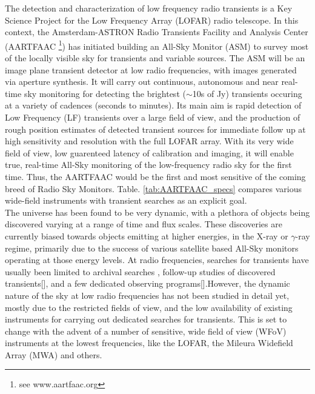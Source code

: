 \documentclass{aa}
\begin{document}
The detection and characterization of low frequency radio transients
is a Key Science Project \citep{fender2006lofar} for the Low Frequency
Array (LOFAR)\citep{vanhaarlem2013lofar} radio telescope. In this
context, the Amsterdam-ASTRON Radio Transients Facility and Analysis
Center (AARTFAAC%
\footnote{see www.aartfaac.org%
}) has initiated building an All-Sky Monitor (ASM) to survey most of
the locally visible sky for transients and variable sources. The ASM
will be an image plane transient detector at low radio frequencies,
with images generated via aperture synthesis. It will carry out continuous,
autonomous and near real-time sky monitoring for detecting the brightest
($\sim$10s of Jy) transients occuring at a variety of cadences (seconds
to minutes). Its main aim is rapid detection of Low Frequency (LF)
transients over a large field of view, and the production of rough
position estimates of detected transient sources for immediate follow
up at high sensitivity and resolution with the full LOFAR array. With
its very wide field of view, low guarenteed latency of calibration
and imaging, it will enable true, real-time All-Sky monitoring of
the low-frequency radio sky for the first time. Thus, the AARTFAAC
would be the first and most sensitive of the coming breed of Radio
Sky Monitors. Table. \ref{tab:AARTFAAC_specs} compares various wide-field
instruments with transient searches as an explicit goal.\\

The universe has been found to be very dynamic, with a plethora of
objects being discovered varying at a range of time and flux scales.
These discoveries are currently biased towards objects emitting at
higher energies, in the X-ray or $\gamma$-ray regime, primarily due
to the success of various satellite based All-Sky monitors operating
at those energy levels. At radio frequencies, searches for transients
have usually been limited to archival searches \citep{bower2007submillijansky,bower2011search},
follow-up studies of discovered transients{[}{]}, and a few dedicated
observing programs{[}{]}.However, the dynamic nature of the sky at
low radio frequencies has not been studied in detail yet, mostly due
to the restricted fields of view, and the low availability of existing
instruments for carrying out dedicated searches for transients. This
is set to change with the advent of a number of sensitive, wide field
of view (WFoV) instruments at the lowest frequencies, like the LOFAR,
the Mileura Widefield Array (MWA) \citep{lonsdale2009murchison}and
others. 
\end{document}
